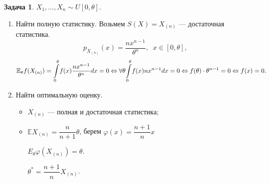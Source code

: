 \documentclass[12pt]{report}
\theoremstyle{definition}
\newtheorem{problem}{Задача}
\begin{document}
\begin{problem}
	$X_1, \ldots, X_n \sim U[0, \theta]$.
	\begin{enumerate}
		\item Найти полную статистику. Возьмем $S(X) = X_{(n)}$ — достаточная статистика.
		$$p_{X_{(n)}}(x) = \dfrac{n x^{n-1}}{\theta^n}, \;\; x \in [0, \theta],$$
		$$\mathbb{E}_\theta f(X_{(n)}) = \displaystyle{\int\displaylimits_0^\theta}f(x)\dfrac{nx^{n-1}}{\theta^n}dx = 0 \Leftrightarrow \forall \theta \displaystyle{\int\displaylimits_0^\theta} f(x)nx^{n-1}dx = 0 \Leftrightarrow f(\theta) \cdot \theta^{n-1} = 0 \Leftrightarrow f(x) = 0.$$
		\item Найти оптимальную оценку.
		\begin{itemize}
			\item $X_{(n)}$ — полная и достаточная статистика;
			\item $\mathbb{E} X_{(n)} = \dfrac{n}{n+1}\theta$, берем $\varphi(x) = \dfrac{n+1}{n}x$
			
			$E_\theta \varphi(X_{(n)}) = \theta$.

			$\theta^* = \dfrac{n+1}{n}X_{(n)}$.
		\end{itemize}
	\end{enumerate}
\end{problem}
\end{document}
